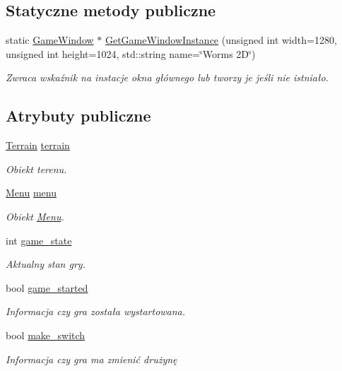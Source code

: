 \subsection*{Statyczne metody publiczne}
\begin{DoxyCompactItemize}
\item 
static \mbox{\hyperlink{class_game_window}{Game\+Window}} $\ast$ \mbox{\hyperlink{class_game_window_a9c480a3795bfd6d22a9dc8a3bae47b1b}{Get\+Game\+Window\+Instance}} (unsigned int width=1280, unsigned int height=1024, std\+::string name=\char`\"{}Worms 2\+D\char`\"{})
\begin{DoxyCompactList}\small\item\em Zwraca wskaźnik na instacje okna głównego lub tworzy je jeśli nie istniało. \end{DoxyCompactList}\end{DoxyCompactItemize}
\subsection*{Atrybuty publiczne}
\begin{DoxyCompactItemize}
\item 
\mbox{\hyperlink{class_terrain}{Terrain}} \mbox{\hyperlink{class_game_window_ab5d02e9738d1f7f3fea4cd146172cf11}{terrain}}
\begin{DoxyCompactList}\small\item\em Obiekt terenu. \end{DoxyCompactList}\item 
\mbox{\hyperlink{class_menu}{Menu}} \mbox{\hyperlink{class_game_window_a3c63dc36f53ecb9b1d055923293daffd}{menu}}
\begin{DoxyCompactList}\small\item\em Obiekt \mbox{\hyperlink{class_menu}{Menu}}. \end{DoxyCompactList}\item 
int \mbox{\hyperlink{class_game_window_aafe2b1768f704b81e4fe94115287b9f7}{game\+\_\+state}}
\begin{DoxyCompactList}\small\item\em Aktualny stan gry. \end{DoxyCompactList}\item 
bool \mbox{\hyperlink{class_game_window_a5ce0d59c491a490bc1d98afcac741016}{game\+\_\+started}}
\begin{DoxyCompactList}\small\item\em Informacja czy gra została wystartowana. \end{DoxyCompactList}\item 
bool \mbox{\hyperlink{class_game_window_a5c677a419a09972501ce2c64b5166180}{make\+\_\+switch}}
\begin{DoxyCompactList}\small\item\em Informacja czy gra ma zmienić drużynę \end{DoxyCompactList}\end{DoxyCompactItemize}


